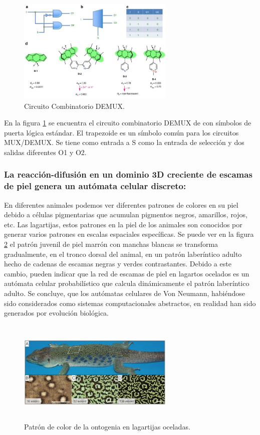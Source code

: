 \documentclass[10pt,conference]{IEEEtran}
\begin{document}
\begin{figure}[H]
 \begin{center}
       \includegraphics[width=7.5cm, height=5cm]{Ind. Natural/Imagen_02.jpg}
      \caption{Circuito Combinatorio DEMUX.}
      \label{Natural2} 
      \end{center}
\end{figure}
En la figura \ref{Natural2} se encuentra el circuito combinatorio DEMUX de  con símbolos de puerta lógica estándar. El trapezoide es un símbolo común para los circuitos MUX/DEMUX. Se tiene como entrada a S como la entrada de selección y dos salidas diferentes O1 y O2.

\vspace{1.5mm}
\subsubsection{\textbf{La reacción-difusión en un dominio 3D creciente de escamas de piel genera un autómata celular discreto: }}
En diferentes animales podemos ver diferentes patrones de colores en su piel debido a células pigmentarias que acumulan pigmentos negros, amarillos, rojos, etc. Las lagartijas, estos patrones en la piel de los animales son conocidos por generar varios patrones en escalas espaciales específicas. Se puede ver en la figura \ref{Natural3} el patrón juvenil de piel marrón con manchas blancas se transforma gradualmente, en el tronco dorsal del animal, en un patrón laberíntico adulto hecho de cadenas de escamas negras y verdes contrastantes. Debido a este cambio,  pueden indicar que la red de escamas de piel en lagartos ocelados es un autómata celular probabilístico que calcula dinámicamente el patrón laberíntico adulto. Se concluye, que los autómatas celulares de Von Neumann, habiéndose sido considerados como sistemas computacionales abstractos, en realidad han sido generados por evolución biológica.
\begin{figure}[H]
 \begin{center}
       \includegraphics[width=7.5cm, height=5cm]{Ind. Natural/Imagen_03.jpg}
      \caption{Patrón de color de la ontogenia en lagartijas oceladas.}
      \label{Natural3} 
      \end{center}
\end{figure}
\end{document}
